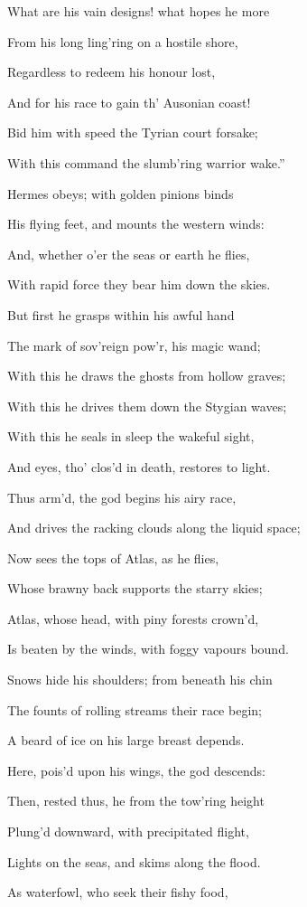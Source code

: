 What are his vain designs! what hopes he more

From his long ling’ring on a hostile shore,

Regardless to redeem his honour lost,

And for his race to gain th’ Ausonian coast!

Bid him with speed the Tyrian court forsake;

With this command the slumb’ring warrior wake.”

Hermes obeys; with golden pinions binds

His flying feet, and mounts the western winds:

And, whether o’er the seas or earth he flies,

With rapid force they bear him down the skies.

But first he grasps within his awful hand

The mark of sov’reign pow’r, his magic wand;

With this he draws the ghosts from hollow graves;

With this he drives them down the Stygian waves;

With this he seals in sleep the wakeful sight,

And eyes, tho’ clos’d in death, restores to light.

Thus arm’d, the god begins his airy race,

And drives the racking clouds along the liquid space;

Now sees the tops of Atlas, as he flies,

Whose brawny back supports the starry skies;

Atlas, whose head, with piny forests crown’d,

Is beaten by the winds, with foggy vapours bound.

Snows hide his shoulders; from beneath his chin

The founts of rolling streams their race begin;

A beard of ice on his large breast depends.

Here, pois’d upon his wings, the god descends:

Then, rested thus, he from the tow’ring height

Plung’d downward, with precipitated flight,

Lights on the seas, and skims along the flood.

As waterfowl, who seek their fishy food,

